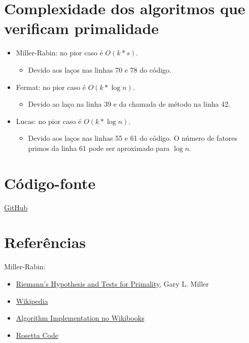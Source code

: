 \documentclass[12pt]{article}
\begin{document}

\section{Complexidade dos algoritmos que verificam primalidade}
\begin{itemize}
  \item Miller-Rabin: no pior caso é $O(k * s)$.
  \begin{itemize}
    \item Devido aos laços nas linhas 70 e 78 do código.
  \end{itemize}
  \item Fermat: no pior caso é  $O(k * \log n)$.
  \begin{itemize}
    \item Devido ao laço na linha 39 e da chamada de método na linha 42.
  \end{itemize}
  \item Lucas: no pior caso é  $O(k * \log n)$.
  \begin{itemize}
    \item Devido aos laços nas linhas 55 e 61 do código. O número de fatores
    primos da linha 61 pode ser aproximado para $\log n$.
  \end{itemize}
\end{itemize}

\section{Código-fonte}
\href{https://github.com/lucasjoao/computer_security/tree/master/t04_prime}
{GitHub}

\section{Referências}
Miller-Rabin:
\begin{itemize}
  \item \href{https://www.cs.cmu.edu/~glmiller/Publications/Papers/Mi76.pdf}
  {Riemann's Hypothesis and Tests for Primality}, Gary L. Miller
  \item \href{https://en.wikipedia.org/wiki/Miller%E2%80%93Rabin_primality_test}
  {Wikipedia}
  \item \href{https://goo.gl/prTCSK}{Algorithm Implementation no Wikibooks}
  \item \href{https://rosettacode.org/wiki/Miller%E2%80%93Rabin_primality_test}
  {Rosetta Code}
\end{itemize}
\end{document}
